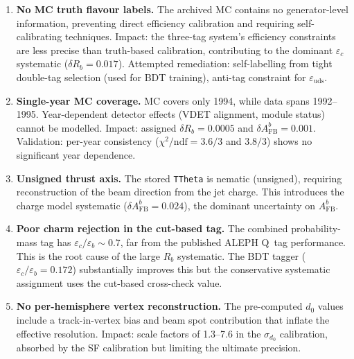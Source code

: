 \documentclass[11pt,a4paper]{article}
\begin{document}
\begin{enumerate}
\item \textbf{No MC truth flavour labels.}
  The archived MC contains no generator-level information, preventing
  direct efficiency calibration and requiring self-calibrating
  techniques.  Impact: the three-tag system's efficiency constraints
  are less precise than truth-based calibration, contributing to
  the dominant $\varepsilon_c$ systematic ($\delta R_b = 0.017$).
  Attempted remediation: self-labelling from tight double-tag selection
  (used for BDT training), anti-tag constraint for $\varepsilon_\mathrm{uds}$.

\item \textbf{Single-year MC coverage.}
  MC covers only 1994, while data spans 1992--1995.  Year-dependent
  detector effects (VDET alignment, module status) cannot be modelled.
  Impact: assigned $\delta R_b = 0.0005$ and $\delta A_\mathrm{FB}^b = 0.001$.
  Validation: per-year consistency ($\chi^2/\mathrm{ndf} = 3.6/3$ and
  $3.8/3$) shows no significant year dependence.

\item \textbf{Unsigned thrust axis.}
  The stored \texttt{TTheta} is nematic (unsigned), requiring
  reconstruction of the beam direction from the jet charge.  This
  introduces the charge model systematic ($\delta A_\mathrm{FB}^b = 0.024$),
  the dominant uncertainty on $A_\mathrm{FB}^b$.

\item \textbf{Poor charm rejection in the cut-based tag.}
  The combined probability-mass tag has $\varepsilon_c/\varepsilon_b \sim 0.7$,
  far from the published ALEPH Q~tag performance.  This is the root cause
  of the large $R_b$ systematic.  The BDT tagger ($\varepsilon_c/\varepsilon_b
  = 0.172$) substantially improves this but the conservative systematic
  assignment uses the cut-based cross-check value.

\item \textbf{No per-hemisphere vertex reconstruction.}
  The pre-computed $d_0$ values include a track-in-vertex bias and
  beam spot contribution that inflate the effective resolution.
  Impact: scale factors of 1.3--7.6 in the $\sigma_{d_0}$ calibration,
  absorbed by the SF calibration but limiting the ultimate precision.
\end{enumerate}

\clearpage

\end{document}
